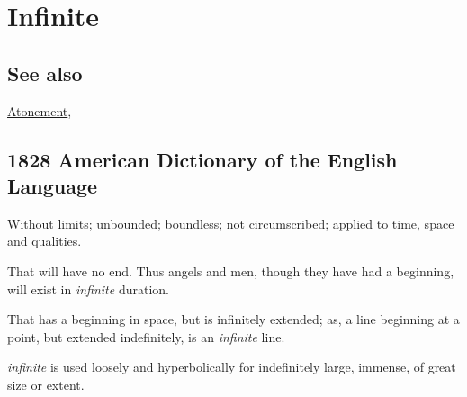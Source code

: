 \section{Infinite}
	\label{INFINITE}
	
\subsection{See also}

	\hyperref[ATONEMENT]{Atonement},

\subsection{1828 American Dictionary of the English Language} %
	\label{INFINITE-1828}

	\begin{compactitem}
		\item[1] Without limits; unbounded; boundless; not circumscribed; applied to time, space and qualities.
		\item[2] That will have no end. Thus angels and men, though they have had a beginning, will exist in \textit{infinite} duration.
		\item[3] That has a beginning in space, but is infinitely extended; as, a line beginning at a point, but extended indefinitely, is an \textit{infinite} line.
		\item[4] \textit{infinite} is used loosely and hyperbolically for indefinitely large, immense, of great size or extent.
	\end{compactitem}




